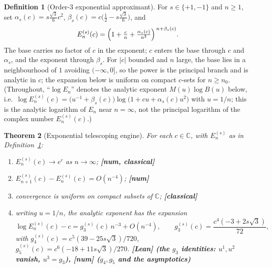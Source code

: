 \documentclass[11pt]{article}
\theoremstyle{plain}
\newtheorem{theorem}{Theorem}
\theoremstyle{definition}
\newtheorem{definition}[theorem]{Definition}
\theoremstyle{remark}
\newcommand{\C}{\mathbb{C}}
\begin{document}
\begin{definition}[Order-3 exponential approximant]\label{def:E}
For $s\in\{+1,-1\}$ and $n\ge1$, set $\alpha_s(c) = s\tfrac{\sqrt3}{6}c^2$,
$\beta_s(c) = c\bigl(\tfrac12 - s\tfrac{\sqrt3}{6}\bigr)$, and
\[
  E_n^{(s)}(c) = \Bigl(1 + \tfrac{c}{n} + \tfrac{\alpha_s(c)}{n^2}\Bigr)^{\,n+\beta_s(c)} .
\]
The base carries no factor of $c$ in the exponent; $c$ enters the base through
$c$ and $\alpha_s$, and the exponent through $\beta_s$. For $|c|$ bounded and
$n$ large, the base lies in a neighbourhood of $1$ avoiding $(-\infty,0]$, so the
power is the principal branch and is analytic in $c$; the expansion below is
uniform on compact $c$-sets for $n\ge n_0$. (Throughout, ``$\log E_n$'' denotes
the analytic exponent $M(u)\log B(u)$ below, i.e.\ $\log E_n^{(s)}(c) =
\bigl(u^{-1}+\beta_s(c)\bigr)\log\bigl(1+cu+\alpha_s(c)u^2\bigr)$ with $u=1/n$;
this is the analytic logarithm of $E_n$ near $n=\infty$, not the principal
logarithm of the complex number $E_n^{(s)}(c)$.)
\end{definition}

\begin{theorem}[Exponential telescoping engine]\label{thm:E}
For each $c\in\C$, with $E_n^{(s)}$ as in Definition~\ref{def:E}:
\begin{enumerate}
\item $E_n^{(s)}(c)\to e^c$ as $n\to\infty$; \hfill\textbf{[num, classical]}
\item $E_{n+1}^{(s)}(c)-E_n^{(s)}(c) = O(n^{-4})$; \hfill\textbf{[num]}
\item convergence is uniform on compact subsets of $\C$; \hfill\textbf{[classical]}
\item writing $u=1/n$, the analytic exponent has the expansion
  \[
    \log E_n^{(s)}(c) - c = g_3^{(s)}(c)\,n^{-3} + O(n^{-4}),
    \qquad g_3^{(s)}(c) = \frac{c^4(-3+2s\sqrt3)}{72},
  \]
  with $g_4^{(s)}(c)=c^5(39-25s\sqrt3)/720$,
  $g_5^{(s)}(c)=c^6(-18+11s\sqrt3)/270$. \hfill\textbf{[Lean] (the $g_3$ identities: $u^1,u^2$ vanish, $u^3=g_3$), [num] ($g_4,g_5$ and the asymptotics)}
\end{enumerate}
\end{theorem}
\end{document}
